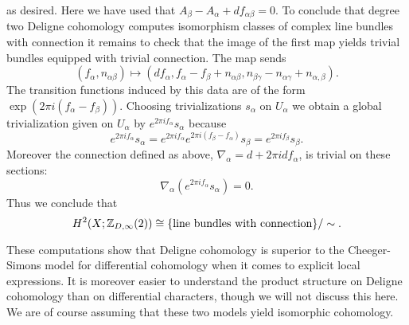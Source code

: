 \documentclass{amsart}
\begin{document}
as desired. Here we have used that $A_\beta-A_\alpha+df_{\alpha\beta}=0$. To conclude that degree
two Deligne cohomology computes isomorphism classes of complex line bundles with connection it
remains to check that the image of the first map yields trivial bundles equipped with trivial
connection. The map sends
\begin{equation*}
    (f_\alpha, n_{\alpha\beta}) \mapsto (df_\alpha, f_\alpha-f_\beta+n_{\alpha\beta}, n_{\beta\gamma} - n_{\alpha\gamma} + n_{\alpha,\beta}).
\end{equation*}
The transition functions induced by this data are of the form $\exp(2\pi i(f_\alpha-f_\beta))$.
Choosing trivializations $s_\alpha$ on $U_\alpha$ we obtain a global trivialization given
on $U_\alpha$ by $e^{2\pi i f_\alpha}s_\alpha$ because 
\begin{equation*}
    e^{2\pi i f_\alpha}s_\alpha = e^{2\pi i f_\alpha} e^{2\pi i(f_\beta-f_\alpha)} s_\beta = e^{2\pi i f_\beta}s_\beta.
\end{equation*}
Moreover the connection defined as above, $\nabla_\alpha = d+2\pi idf_\alpha$, is trivial
on these sections: 
\begin{equation*}
    \nabla_\alpha(e^{2\pi if_\alpha}s_\alpha) = 0. %
\end{equation*}
Thus we conclude that 
\begin{equation*}
    H^2(X;\mathbb{Z}_{D,\infty}(2)) \cong \{\text{line bundles with connection}\}/\sim.
\end{equation*}

These computations show that Deligne cohomology is superior to the Cheeger-Simons
model for differential cohomology when it comes to explicit local expressions.
It is moreover easier to understand the product structure on Deligne cohomology
than on differential characters, though we will not discuss this here. We are
of course assuming that these two models yield isomorphic cohomology.
\end{document}
